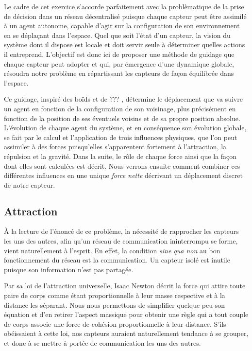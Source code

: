 \documentclass[10pt]{article}
\begin{document}
\begin{multicols}{2}
Le cadre de cet exercice s'accorde parfaitement avec la problèmatique
de la prise de décision dans un réseau décentralisé puisque chaque
capteur peut être assimilé à un agent autonome, capable d'agir sur la
configuration de son environnement en se déplaçant dans l'espace. Quel
que soit l'état d'un capteur, la vision du système dont il dispose est
locale et doit servir seule à déterminer quelles actions il
entreprend. L'objectif est donc ici de proposer une méthode de guidage
que chaque capteur peut adopter et qui, par émergence d'une dynamique
globale, résoudra notre problème en répartissant les capteurs de façon
équilibrée dans l'espace.

Ce guidage, inspiré des boïds \cite{Reynolds1987} et de ???
\cite{Cheng2011497}, détermine le déplacement que va suivre un agent
en fonction de la configuration de son voisinage, plus précisément en
fonction de la position de ses éventuels voisins et de sa propre
position absolue. L'évolution de chaque agent du système, et en
conséquence son évolution globale, se fait par le calcul et
l'application de trois influences physiques, que l'on peut assimiler à
des forces puisqu'elles s'apparentent fortement à l'attraction, la
répulsion et la gravité. Dans la suite, le rôle de chaque force ainsi
que la façon dont elles sont calculées est décrit. Nous verrons
ensuite comment combiner ces différentes influences en une unique
\textit{force nette} décrivant un déplacement discret de notre
capteur.

\subsection{Attraction}

\`A la lecture de l'énoncé de ce problème, la nécessité de rapprocher
les capteurs les uns des autres, afin qu'un réseau de communication
ininterrompu se forme, vient naturellement à l'esprit. En effet, la
condition \textit{sine qua non} au bon fonctionnement du réseau est la
communication. Un capteur isolé est inutile puisque son
information n'est pas partagée.

Par sa loi de l'attraction universelle, Isaac Newton décrit la force
qui attire toute paire de corps comme étant proportionnelle à leur
masse respective et à la distance les séparant. Nous nous permettons
de simplifier quelque peu son équation et d'en retirer l'aspect
massique pour obtenir une règle qui a tout couple de corps associe une
force de cohésion proportionnelle à leur distance. S'ils obéissaient à
cette loi, nos capteurs auraient naturellement tendance à se grouper,
et donc à se mettre à portée de communication les uns des autres.


\end{multicols}
\end{document}
